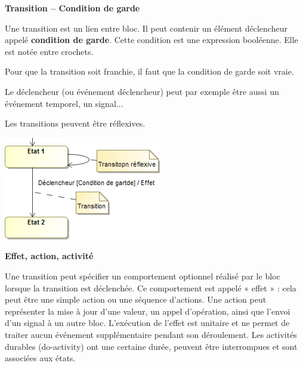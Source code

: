 \documentclass[10pt]{article}
\begin{document}
\begin{defi}
\begin{minipage}[c]{.55\linewidth}
\textbf{Transition -- Condition de garde}

Une transition est un lien entre bloc. Il peut contenir un élément déclencheur appelé \textbf{condition de garde}. Cette condition est une expression booléenne. Elle est notée entre crochets.

Pour que la transition soit franchie, il faut que la condition de garde soit vraie. 

Le déclencheur (ou événement déclencheur) peut par exemple être aussi un événement temporel, un signal...

 Les transitions peuvent être réflexives. 

\end{minipage} \hfill
\begin{minipage}[c]{.4 \linewidth}
\begin{center}
\includegraphics[width=.95\textwidth]{images/Transition}
\end{center}
\end{minipage}
\end{defi}


\begin{defi}
\begin{minipage}[c]{.8\linewidth}
\textbf{Effet, action, activité}

Une transition peut spécifier un comportement optionnel réalisé par le bloc lorsque la transition est
déclenchée. Ce comportement est appelé « effet » : cela peut être une simple action ou une
séquence d’actions. Une action peut représenter la mise à jour d’une valeur, un appel d’opération,
ainsi que l’envoi d’un signal à un autre bloc. L’exécution de l’effet est unitaire et ne permet de traiter
aucun événement supplémentaire pendant son déroulement. Les activités durables (do-activity)
ont une certaine durée, peuvent être interrompues et sont associées aux états.

\end{minipage} \hfill
\begin{minipage}[c]{.15 \linewidth}
\begin{center}
\end{center}
\end{minipage}
\end{defi}
\end{document}
